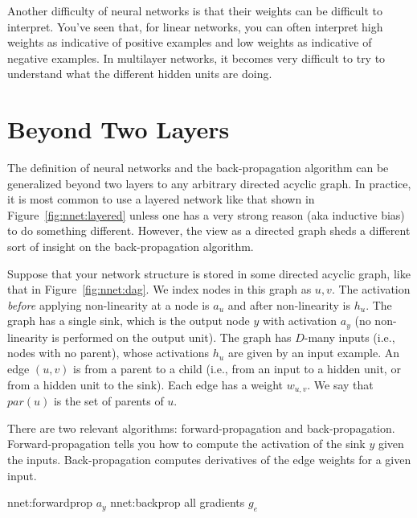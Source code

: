 Another difficulty of neural networks is that their weights can be
difficult to interpret.  You've seen that, for linear networks, you
can often interpret high weights as indicative of positive examples
and low weights as indicative of negative examples.  In multilayer
networks, it becomes very difficult to try to understand what the
different hidden units are doing.  



\section{Beyond Two Layers}


The definition of neural networks and the back-propagation algorithm
can be generalized beyond two layers to any arbitrary directed acyclic
graph.  In practice, it is most common to use a layered network like
that shown in Figure~\ref{fig:nnet:layered} unless one has a very
strong reason (aka inductive bias) to do something different.
However, the view as a directed graph sheds a different sort of
insight on the back-propagation algorithm.


Suppose that your network structure is stored in some directed acyclic
graph, like that in Figure~\ref{fig:nnet:dag}.  We index nodes in this
graph as $u,v$.  The activation \emph{before} applying non-linearity
at a node is $a_u$ and after non-linearity is $h_u$.  The graph has a
single sink, which is the output node $y$ with activation $a_y$ (no
non-linearity is performed on the output unit).  The graph has
$D$-many inputs (i.e., nodes with no parent), whose activations $h_u$
are given by an input example.  An edge $(u,v)$ is from a parent to a
child (i.e., from an input to a hidden unit, or from a hidden unit to
the sink).  Each edge has a weight $w_{u,v}$.  We say that
$\textit{par}(u)$ is the set of parents of $u$.

There are two relevant algorithms: forward-propagation and
back-propagation.  Forward-propagation tells you how to compute the
activation of the sink $y$ given the inputs.  Back-propagation
computes derivatives of the edge weights for a given input.

\newalgorithm%
  {nnet:forwardprop}%
  {}
  {
\ENDFOR
{}
\ENDFOR
\RETURN $a_y$
}
\newalgorithm%
  {nnet:backprop}%
  {}
  {
\ENDFOR
\ENDFOR
\RETURN all gradients $g_e$
}

